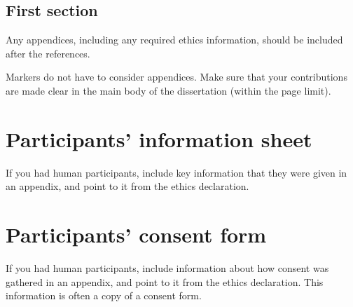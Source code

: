 \documentclass[logo,bsc,singlespacing,parskip]{infthesis}
\theoremstyle{definition}
\begin{document}
\section{First section}

Any appendices, including any required ethics information, should be included
after the references.

Markers do not have to consider appendices. Make sure that your contributions
are made clear in the main body of the dissertation (within the page limit).

\chapter{Participants' information sheet}

If you had human participants, include key information that they were given in
an appendix, and point to it from the ethics declaration.

\chapter{Participants' consent form}

If you had human participants, include information about how consent was
gathered in an appendix, and point to it from the ethics declaration.
This information is often a copy of a consent form.
\end{document}
